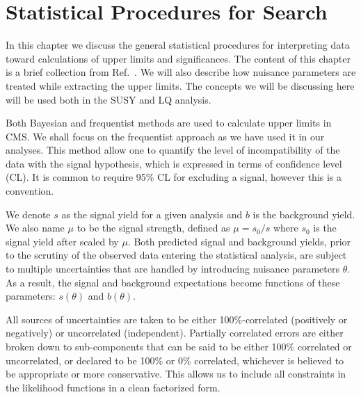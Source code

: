 \chapter{Statistical Procedures for Search  \label{Statistical Procedures for Search}}

In this chapter we discuss the general statistical procedures for interpreting data toward calculations of upper limits and significances. The content of this chapter is a brief collection from Ref.~\cite{CMS-NOTE-2011-005}.  We will also describe how nuisance parameters are treated while extracting the upper limits. The concepts we will be discussing here will be used both in the SUSY and LQ analysis.

Both Bayesian and frequentist methods are used to calculate upper limits in CMS. We shall focus on  the frequentist approach as we have used it in our analyses. This method allow one to quantify the level of incompatibility of the data with the signal hypothesis, which is expressed in terms of  confidence level (CL). It is common to require 95\% CL for excluding a signal, however this is a convention.

We denote $s$ as the signal yield for a given analysis and  $b$ is the background yield. We also name $\mu$ to be the signal strength, defined as  $\mu =s_{0}/s$ where $s_{0}$ is the signal yield after scaled by $\mu$. Both predicted signal and background yields, prior to the scrutiny of the observed data entering the statistical analysis, are subject to multiple uncertainties that are handled
by introducing nuisance parameters $\theta$. As a result, the signal and background expectations become functions of these parameters: $s(\theta)$ and $b(\theta)$.

All sources of uncertainties are taken to be either 100\%-correlated (positively or negatively) or uncorrelated (independent).  Partially correlated errors are either broken down to  sub-components  that  can  be  said  to  be  either  100\%  correlated  or  uncorrelated,  or
declared  to  be  100\%  or  0\%  correlated,  whichever  is  believed  to  be  appropriate  or  more
conservative.   This  allows  us  to  include  all  constraints  in  the  likelihood  functions  in  a
clean factorized form.





